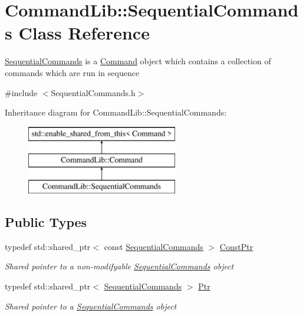 \hypertarget{class_command_lib_1_1_sequential_commands}{}\section{Command\+Lib\+:\+:Sequential\+Commands Class Reference}
\label{class_command_lib_1_1_sequential_commands}


\mbox{\hyperlink{class_command_lib_1_1_sequential_commands}{Sequential\+Commands}} is a \mbox{\hyperlink{class_command_lib_1_1_command}{Command}} object which contains a collection of commands which are run in sequence  




{\ttfamily \#include $<$Sequential\+Commands.\+h$>$}

Inheritance diagram for Command\+Lib\+:\+:Sequential\+Commands\+:\begin{figure}[H]
\begin{center}
\leavevmode
\includegraphics[height=3.000000cm]{class_command_lib_1_1_sequential_commands}
\end{center}
\end{figure}
\subsection*{Public Types}
\begin{DoxyCompactItemize}
\item 
typedef std\+::shared\+\_\+ptr$<$ const \mbox{\hyperlink{class_command_lib_1_1_sequential_commands}{Sequential\+Commands}} $>$ \mbox{\hyperlink{class_command_lib_1_1_sequential_commands_a833e8df5749f6f13b93eaa1d724799e9}{Const\+Ptr}}
\begin{DoxyCompactList}\small\item\em Shared pointer to a non-\/modifyable \mbox{\hyperlink{class_command_lib_1_1_sequential_commands}{Sequential\+Commands}} object\end{DoxyCompactList}\item 
typedef std\+::shared\+\_\+ptr$<$ \mbox{\hyperlink{class_command_lib_1_1_sequential_commands}{Sequential\+Commands}} $>$ \mbox{\hyperlink{class_command_lib_1_1_sequential_commands_adf77d8fcaebe414c283e553ba0604228}{Ptr}}
\begin{DoxyCompactList}\small\item\em Shared pointer to a \mbox{\hyperlink{class_command_lib_1_1_sequential_commands}{Sequential\+Commands}} object\end{DoxyCompactList}\end{DoxyCompactItemize}
